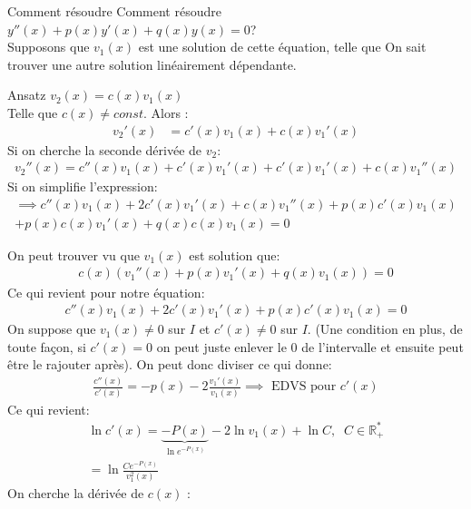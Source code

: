     \begin{parag}{Comment résoudre}
        Comment résoudre $y''(x) + p(x)y'(x) + q(x)y(x) = 0$? \\
        Supposons que $v_1(x)$ est une solution de cette équation, telle que On sait trouver une autre solution linéairement dépendante.
        \begin{subparag}{Ansatz}
            $v_2(x) = c(x)v_1(x)$
            \\
            Telle que $c(x) \neq const$. Alors : 
            \begin{align*}
                v_2'(x) &= c'(x)v_1(x) + c(x)v_1'(x) 
            \end{align*}
            Si on cherche la seconde dérivée de $v_2$:
            \begin{align*}
                  v_2''(x) =  c''(x)v_1(x) + c'(x)v_1'(x) + c'(x)v_1'(x) + c(x)v_1''(x)
              \end{align*}
              Si on simplifie l'expression:
              \begin{align*}
          \implies c''(x)v_1(x) + 2c'(x)v_1'(x) + c(x)v_1''(x) + p(x)c'(x)v_1(x) \\ + p(x)c(x)v_1'(x) + q(x)c(x)v_1(x) = 0 
            \end{align*}
            
            On peut trouver vu que $v_1(x)$ est solution que:
            \begin{align*}
          c(x)(v_1''(x) + p(x)v_1'(x) + q(x)v_1(x)) = 0
            \end{align*}
           Ce qui revient pour notre équation:
           \begin{align*}
               c''(x)v_1(x) + 2c'(x)v_1'(x) + p(x)c'(x)v_1(x) = 0
           \end{align*}
           On suppose que $v_1(x) \neq 0$ sur $I$ et $c'(x) \neq 0$ sur $I$. (Une condition en plus, de toute façon, si $c'(x) = 0$ on peut juste enlever le $0$ de l'intervalle et ensuite peut être le rajouter après). On peut donc diviser ce qui donne:
           \begin{align*}
               \frac{c''(x)}{c'(x)} = -p(x) - 2 \frac{v_1'(x)}{v_1(x)} \implies \text{ EDVS  pour } c'(x)
           \end{align*}
           Ce qui revient:
           \begin{align*}
               \ln c'(x) = \underbrace{-P(x)}_{\ln e^{-P(x)}} - 2\ln v_1(x) + \ln C, \; \; C \in \mathbb{R}_+^* \\
               = \ln \frac{C e^{-P(x)}}{v_1^2(x)}
           \end{align*} 
           On cherche la dérivée de $c(x)$ : 
           

\end{subparag}
\end{parag}
